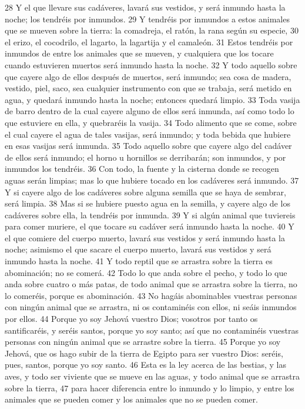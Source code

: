 28 Y el que llevare sus cadáveres, lavará sus vestidos, y será inmundo hasta la noche; los tendréis por inmundos.
29 Y tendréis por inmundos a estos animales que se mueven sobre la tierra: la comadreja, el ratón, la rana según su especie,
30 el erizo, el cocodrilo, el lagarto, la lagartija y el camaleón.
31 Estos tendréis por inmundos de entre los animales que se mueven, y cualquiera que los tocare cuando estuvieren muertos será inmundo hasta la noche.
32 Y todo aquello sobre que cayere algo de ellos después de muertos, será inmundo; sea cosa de madera, vestido, piel, saco, sea cualquier instrumento con que se trabaja, será metido en agua, y quedará inmundo hasta la noche; entonces quedará limpio.
33 Toda vasija de barro dentro de la cual cayere alguno de ellos será inmunda, así como todo lo que estuviere en ella, y quebraréis la vasija.
34 Todo alimento que se come, sobre el cual cayere el agua de tales vasijas, será inmundo; y toda bebida que hubiere en esas vasijas será inmunda.
35 Todo aquello sobre que cayere algo del cadáver de ellos será inmundo; el horno u hornillos se derribarán; son inmundos, y por inmundos los tendréis.
36 Con todo, la fuente y la cisterna donde se recogen aguas serán limpias; mas lo que hubiere tocado en los cadáveres será inmundo.
37 Y si cayere algo de los cadáveres sobre alguna semilla que se haya de sembrar, será limpia.
38 Mas si se hubiere puesto agua en la semilla, y cayere algo de los cadáveres sobre ella, la tendréis por inmunda.
39 Y si algún animal que tuviereis para comer muriere, el que tocare su cadáver será inmundo hasta la noche.
40 Y el que comiere del cuerpo muerto, lavará sus vestidos y será inmundo hasta la noche; asimismo el que sacare el cuerpo muerto, lavará sus vestidos y será inmundo hasta la noche.
41 Y todo reptil que se arrastra sobre la tierra es abominación; no se comerá.
42 Todo lo que anda sobre el pecho, y todo lo que anda sobre cuatro o más patas, de todo animal que se arrastra sobre la tierra, no lo comeréis, porque es abominación.
43 No hagáis abominables vuestras personas con ningún animal que se arrastra, ni os contaminéis con ellos, ni seáis inmundos por ellos.
44 Porque yo soy Jehová vuestro Dios; vosotros por tanto os santificaréis, y seréis santos, porque yo soy santo; así que no contaminéis vuestras personas con ningún animal que se arrastre sobre la tierra.
45 Porque yo soy Jehová, que os hago subir de la tierra de Egipto para ser vuestro Dios: seréis, pues, santos, porque yo soy santo.
46 Esta es la ley acerca de las bestias, y las aves, y todo ser viviente que se mueve en las aguas, y todo animal que se arrastra sobre la tierra,
47 para hacer diferencia entre lo inmundo y lo limpio, y entre los animales que se pueden comer y los animales que no se pueden comer.  

